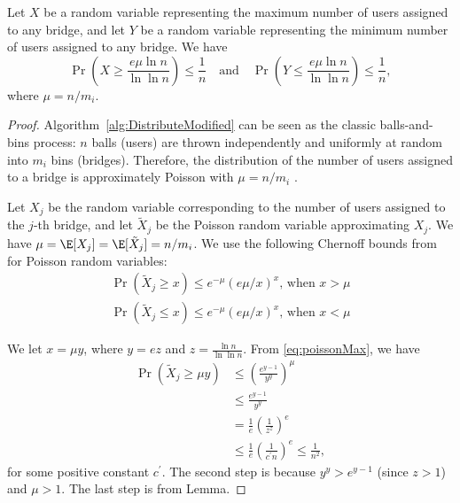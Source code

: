 %	
\begin{lemma}
	Let $X$ be a random variable representing the maximum number of users assigned to any bridge, and let $Y$ be a random variable representing the minimum number of users assigned to any bridge. We have 
	\[
		\Pr\left(X \geq \frac{e\mu\ln{n}}{\ln{\ln{n}}}\right) \leq \frac{1}{n} \quad \text{and} \quad 
		\Pr\left(Y \leq \frac{e\mu\ln{n}}{\ln{\ln{n}}}\right) \leq \frac{1}{n},
	\]
	where ${\mu = n/m_i}$.
\end{lemma}
\begin{proof}
	Algorithm~\ref{alg:DistributeModified} can be seen as the classic balls-and-bins process: $n$ balls (users) are thrown independently and uniformly at random into $m_i$ bins (bridges). Therefore, the distribution of the number of users assigned to a bridge is approximately Poisson with ${\mu = n/m_i}$ \cite[Chapter~5]{Michael2005}.
	
	Let $X_j$ be the random variable corresponding to the number of users assigned to the $j$-th bridge, and let $\tilde{X}_j$ be the Poisson random variable approximating $X_j$. We have ${\mu = \E[X_j] = \E[\tilde{X}_j] = n/m_i}$. We use the following Chernoff bounds from \cite[Chapter~5]{Michael2005} for Poisson random variables:
	\begin{align}
	\Pr(\tilde{X}_j \geq x) \leq e^{-\mu}(e\mu/x)^x \text{, when } x > \mu \label{eq:poissonMax}\\
	\Pr(\tilde{X}_j \leq x) \leq e^{-\mu}(e\mu/x)^x \text{, when } x < \mu \label{eq:poissonMin}
	\end{align}
	
	We let ${x = \mu y}$, where ${y = ez}$ and ${z = \frac{\ln{n}}{\ln{\ln{n}}}}$. From \eqref{eq:poissonMax}, we have
	\begin{align*}
	\Pr(\tilde{X}_j \geq \mu y) &\leq \left(\frac{e^{y-1}}{y^y}\right)^\mu \\
	&\leq \frac{e^{y-1}}{y^y} \\ 
	&= \frac{1}{e}\left(\frac{1}{z^z}\right)^e \\
	&\leq \frac{1}{e}\left(\frac{1}{c^\prime n}\right)^e \leq \frac{1}{n^2},
	\end{align*}
	for some positive constant $c^\prime$. The second step is because ${y^y > e^{y-1}}$ (since ${z > 1}$) and ${\mu > 1}$. The last step is from Lemma.
\end{proof}

